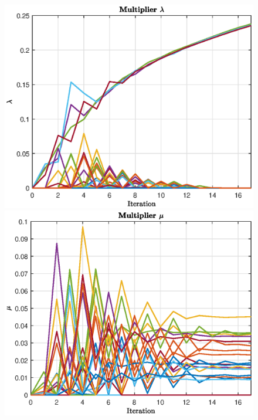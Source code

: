 \begin{figure}[H]
    \center
    \begin{minipage}{5.4cm}
        \includegraphics[width=\columnwidth]{figures/images/lambda.eps}
    \end{minipage}
    \begin{minipage}{5.4cm}
        \includegraphics[width=\columnwidth]{figures/images/mu.eps}
    \end{minipage}
    \begin{minipage}{5.4cm}

\end{minipage}
\end{figure}

